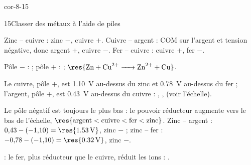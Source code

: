 \begin{blocLivre}{cor-8-15}
\begin{corrige}{15}{Classer des métaux à l'aide de piles}
\begin{questions}
\item Zinc -- cuivre : zinc $-$, cuivre $+$. Cuivre -- argent : COM sur l'argent et tension négative, donc argent $+$,
cuivre $-$. Fer -- cuivre : cuivre $+$, fer $-$.
\item Pôle $-$ :  ; pôle $+$ :  ; $\res{\ce{Zn + Cu^2+ -> Zn^2+ + Cu}}$.
\item Le cuivre, pôle $+$, est \qty{1,10}{V} au-dessus du zinc et \qty{0,78}{V} au-dessus du fer ; l'argent, pôle $+$, est
\qty{0,43}{V} au-dessus du cuivre : , ,
 (voir l'échelle).
\item Le pôle négatif est toujours le plus bas : le pouvoir réducteur augmente vers le bas de l'échelle,
$\res{\text{argent}<\text{cuivre}<\text{fer}<\text{zinc}}$. Zinc -- argent : $0{,}43-(-1{,}10)=\res{\qty{1,53}{V}}$, zinc $-$ ;
zinc -- fer : $-0{,}78-(-1{,}10)=\res{\qty{0,32}{V}}$, zinc $-$.
\item {} : le fer, plus réducteur que le cuivre, réduit les ions  :
.
\end{questions}
\end{corrige}
\end{blocLivre}
